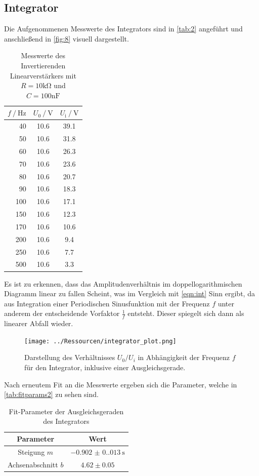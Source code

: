 \documentclass[12pt]{article}
\begin{document}
\subsection{Integrator}
Die Aufgenommenen Messwerte des Integrators sind in \autoref{tab:2} angeführt und anschließend in \autoref{fig:8} visuell dargestellt.
\begin{table}[H]
  \centering
  \caption{Messwerte des Invertierenden Linearverstärkers mit $R=10\unit{\kilo\ohm}$ und $C=100\unit{\nano\farad}$}
  \begin{tabular}{r | c c}
  \toprule
   $f\mathbin{/}\unit{\hertz}$ &  $U_0\mathbin{/}\unit{\volt}$&  $U_{\text{i}}\mathbin{/}\unit{\volt}$ \\
  \midrule
  40& 10.6&39.1\\
  50& 10.6&31.8\\
  60& 10.6&26.3\\
  70& 10.6&23.6\\
  80& 10.6&20.7\\
  90& 10.6&18.3\\
  100& 10.6&17.1\\
  150& 10.6&12.3\\
  170& 10.6&10.6\\
  200& 10.6&9.4\\
  250& 10.6&7.7\\
  500& 10.6&3.3\\
  \bottomrule
  \end{tabular}
  \label{tab:2}
\end{table}
Es ist zu erkennen, dass das Amplitudenverhältnis im doppellogarithmischen Diagramm linear zu fallen Scheint, was im Vergleich mit \autoref{eqn:int} Sinn ergibt, da aus Integration einer Periodischen Sinusfunktion mit der Frequenz $f$ unter anderem der entscheidende Vorfaktor $\frac{1}{f}$ entsteht.
Dieser spiegelt sich dann als linearer Abfall wieder.
\begin{figure}[H]
  \centering
  \texttt{[image: ../Ressourcen/integrator\_plot.png]}
  \caption{Darstellung des Verhältnisses $U_0/U_i$ in Abhängigkeit der Frequenz $f$ für den Integrator, inklusive einer Ausgleichsgerade.}
  \label{fig:8}
\end{figure}
Nach erneutem Fit an die Messwerte ergeben sich die Parameter, welche in \autoref{tab:fitparams2} zu sehen sind.
\begin{table}[H]
  \centering
  \caption{Fit-Parameter der Ausgleichsgeraden des Integrators}
  \begin{tabular}{c c}
  \toprule
  Parameter & Wert \\
  \midrule
  Steigung $m$ & $\SI{-0.902(0.013)}{\second}$ \\
  Achsenabschnitt $b$ & $4.62\pm0.05$ \\
  \bottomrule
  \end{tabular}
  \label{tab:fitparams2}
\end{table}
\end{document}
